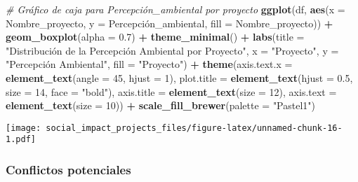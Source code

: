 \documentclass[
]{article}
\newenvironment{Shaded}{\begin{snugshade}}{\end{snugshade}}
\newcommand{\AttributeTok}[1]{\textcolor[rgb]{0.13,0.29,0.53}{#1}}
\newcommand{\CommentTok}[1]{\textcolor[rgb]{0.56,0.35,0.01}{\textit{#1}}}
\newcommand{\DecValTok}[1]{\textcolor[rgb]{0.00,0.00,0.81}{#1}}
\newcommand{\FloatTok}[1]{\textcolor[rgb]{0.00,0.00,0.81}{#1}}
\newcommand{\FunctionTok}[1]{\textcolor[rgb]{0.13,0.29,0.53}{\textbf{#1}}}
\newcommand{\NormalTok}[1]{#1}
\newcommand{\SpecialCharTok}[1]{\textcolor[rgb]{0.81,0.36,0.00}{\textbf{#1}}}
\newcommand{\StringTok}[1]{\textcolor[rgb]{0.31,0.60,0.02}{#1}}
\begin{document}
\begin{Shaded}
\begin{Highlighting}[]
\CommentTok{\# Gráfico de caja para Percepción\_ambiental por proyecto}
\FunctionTok{ggplot}\NormalTok{(df, }\FunctionTok{aes}\NormalTok{(}\AttributeTok{x =}\NormalTok{ Nombre\_proyecto, }\AttributeTok{y =}\NormalTok{ Percepción\_ambiental, }\AttributeTok{fill =}\NormalTok{ Nombre\_proyecto)) }\SpecialCharTok{+}
  \FunctionTok{geom\_boxplot}\NormalTok{(}\AttributeTok{alpha =} \FloatTok{0.7}\NormalTok{) }\SpecialCharTok{+}
  \FunctionTok{theme\_minimal}\NormalTok{() }\SpecialCharTok{+}
  \FunctionTok{labs}\NormalTok{(}\AttributeTok{title =} \StringTok{"Distribución de la Percepción Ambiental por Proyecto"}\NormalTok{,}
       \AttributeTok{x =} \StringTok{"Proyecto"}\NormalTok{, }\AttributeTok{y =} \StringTok{"Percepción Ambiental"}\NormalTok{, }\AttributeTok{fill =} \StringTok{"Proyecto"}\NormalTok{) }\SpecialCharTok{+}
  \FunctionTok{theme}\NormalTok{(}\AttributeTok{axis.text.x =} \FunctionTok{element\_text}\NormalTok{(}\AttributeTok{angle =} \DecValTok{45}\NormalTok{, }\AttributeTok{hjust =} \DecValTok{1}\NormalTok{), }
        \AttributeTok{plot.title =} \FunctionTok{element\_text}\NormalTok{(}\AttributeTok{hjust =} \FloatTok{0.5}\NormalTok{, }\AttributeTok{size =} \DecValTok{14}\NormalTok{, }\AttributeTok{face =} \StringTok{"bold"}\NormalTok{),}
        \AttributeTok{axis.title =} \FunctionTok{element\_text}\NormalTok{(}\AttributeTok{size =} \DecValTok{12}\NormalTok{),}
        \AttributeTok{axis.text =} \FunctionTok{element\_text}\NormalTok{(}\AttributeTok{size =} \DecValTok{10}\NormalTok{)) }\SpecialCharTok{+}
  \FunctionTok{scale\_fill\_brewer}\NormalTok{(}\AttributeTok{palette =} \StringTok{"Pastel1"}\NormalTok{)}
\end{Highlighting}
\end{Shaded}

\texttt{[image: social\_impact\_projects\_files/figure-latex/unnamed-chunk-16-1.pdf]}

\subsubsection{\texorpdfstring{\textbf{Conflictos
potenciales}}{Conflictos potenciales}}\label{conflictos-potenciales}
\end{document}
